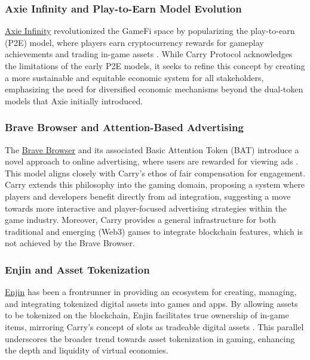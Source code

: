 \subsubsection{Axie Infinity and Play-to-Earn Model Evolution}

\href{https://axieinfinity.com/}{Axie Infinity} revolutionized the GameFi space by popularizing the play-to-earn (P2E) model, where players earn cryptocurrency rewards for gameplay achievements and trading in-game assets \cite{lai2023quantitative}. While Carry Protocol acknowledges the limitations of the early P2E models, it seeks to refine this concept by creating a more sustainable and equitable economic system for all stakeholders, emphasizing the need for diversified economic mechanisms beyond the dual-token models that Axie initially introduced.

\subsubsection{Brave Browser and Attention-Based Advertising}

The \href{https://brave.com/}{Brave Browser} and its associated Basic Attention Token (BAT) introduce a novel approach to online advertising, where users are rewarded for viewing ads \cite{trotz2019times}. This model aligns closely with Carry's ethos of fair compensation for engagement. Carry extends this philosophy into the gaming domain, proposing a system where players and developers benefit directly from ad integration, suggesting a move towards more interactive and player-focused advertising strategies within the game industry. Moreover, Carry provides a general infrastructure for both traditional and emerging (Web3) games to integrate blockchain features, which is not achieved by the Brave Browser.

\subsubsection{Enjin and Asset Tokenization}

\href{https://enjin.io/}{Enjin} has been a frontrunner in providing an ecosystem for creating, managing, and integrating tokenized digital assets into games and apps. By allowing assets to be tokenized on the blockchain, Enjin facilitates true ownership of in-game items, mirroring Carry's concept of slots as tradeable digital assets \cite{marin2023review}. This parallel underscores the broader trend towards asset tokenization in gaming, enhancing the depth and liquidity of virtual economies.

